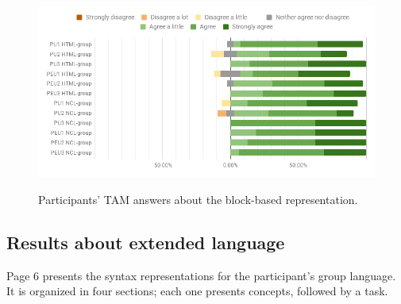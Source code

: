 \documentclass[
  doutorado,
  american
]{ThesisPUC}
\newcommand{\captionvspace}{\vspace{-1.3em}}
\begin{document}
\begin{figure}[!ht]
\begin{center}
	\includegraphics[width=14cm, keepaspectratio]{img/img22.png}
    \captionvspace
	\caption{Participants’ TAM answers about the block-based representation.}
    \captionvspace
	\label{fig:blocks-res3}
\end{center}
\end{figure}

\subsection{Results about extended language}
\label{sec:evaluation:lang-res}

Page 6 presents the syntax representations for the participant’s group language.
It is organized in four sections; each one presents concepts, followed by a
task.
\end{document}
